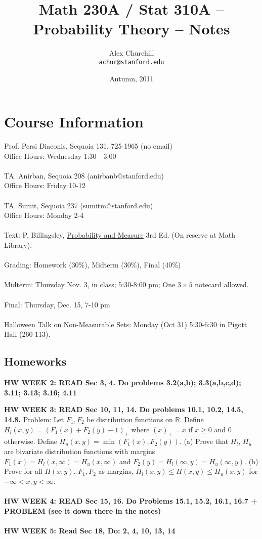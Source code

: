 \documentclass[12pt]{article}
\title{Math 230A / Stat 310A -- Probability Theory -- Notes}
\author{
Alex Churchill\\
\small \texttt{achur@stanford.edu}
}
\date{Autumn, 2011}
\begin{document}
\maketitle
\thispagestyle{empty} %
\tableofcontents


\newpage

\setcounter{page}{1} %

\section{Course Information}
Prof. Persi Diaconis, Sequoia 131, 725-1965 (no email) \\
Office Hours: Wednesday 1:30 - 3:00
\\ \\
TA. Anirban, Sequoia 208 (anirbanb@stanford.edu) \\
Office Hours: Friday 10-12
\\ \\
TA. Sumit, Sequoia 237 (sumitm@stanford.edu) \\
Office Hours: Monday 2-4
\\ \\
Text: P. Billingsley, \underline{Probability and Measure} 3rd Ed. (On reserve at Math Library).
\\ \\
Grading: Homework (30\%), Midterm (30\%), Final (40\%)
\\ \\
Midterm: Thursday Nov. 3, in class; 5:30-8:00 pm; One $3 \times 5$ notecard allowed.
\\ \\
Final: Thursday, Dec. 15, 7-10 pm
\\ \\
Halloween Talk on Non-Measurable Sets: Monday (Oct 31) 5:30-6:30 in Pigott Hall (260-113).

\subsection{Homeworks}

{\bf HW WEEK 2: READ Sec 3, 4.  Do problems 3.2(a,b); 3.3(a,b,c,d); 3.11; 3.13; 3.16; 4.11}

{\bf HW WEEK 3: READ Sec 10, 11, 14.  Do problems 10.1, 10.2, 14.5, 14.8.}
Problem: Let $F_1, F_2$ be distribution functions on $\mathbb{R}$.  Define $H_l(x,y) = (F_1(x) + F_2(y) - 1)_+$ where $(x)_+ = x$ if $x \ge 0$ and $0$ otherwise.  Define $H_u(x,y) = \min(F_1(x), F_2(y))$.  (a) Prove that $H_l$, $H_u$ are bivariate distribution functions with margins $F_1(x) = H_l(x, \infty) = H_u(x, \infty)$ and $F_2(y) = H_l(\infty, y) = H_u(\infty, y)$. (b) Prove for all $H(x,y)$, $F_1, F_2$ as margins, $H_l(x,y) \le H(x,y) \le H_u(x,y)$ for $-\infty < x,y < \infty$.
\\ \\
{\bf HW WEEK 4: READ Sec 15, 16.  Do Problems 15.1, 15.2, 16.1, 16.7 + PROBLEM (see it down there in the notes)}
\\ \\
{\bf HW WEEK 5: Read Sec 18, Do: 2, 4, 10, 13, 14}
\end{document}
